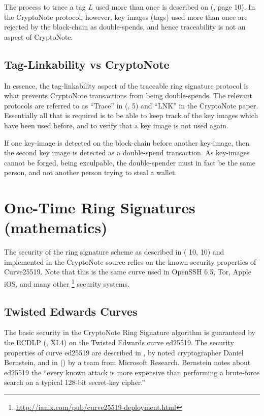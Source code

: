 \documentclass[12pt,english]{mrl}
\numberwithin{equation}{section}
\numberwithin{figure}{section}
\begin{document}
The process to trace a tag $L$ used more than once is described
on (\cite{FS}, page 10). In the CryptoNote protocol, however, key
images (tags) used more than once are rejected by the block-chain
as double-spends, and hence traceability is not an aspect of CryptoNote.


\subsection{Tag-Linkability vs CryptoNote}

In essence, the tag-linkability aspect of the traceable ring signature
protocol is what prevents CryptoNote transactions from being double-spends.
The relevant protocols are referred to as ``Trace'' in (\cite{FS},
5) and ``LNK'' in the CryptoNote paper. Essentially all that is
required is to be able to keep track of the key images which have
been used before, and to verify that a key image is not used again. 

If one key-image is detected on the block-chain before
another key-image, then the second key image is detected as a double-spend
transaction. As key-images cannot be forged, being exculpable, the
double-spender must in fact be the same person, and not another person
trying to steal a wallet. 


\section{One-Time Ring Signatures (mathematics)}

The security of the ring signature scheme as described in (\cite{FS}
10, \cite{CN} 10) and implemented in the CryptoNote source relies on the known
security properties of Curve25519. Note that this is the same curve
used in OpenSSH 6.5, Tor, Apple iOS, and many other%
\footnote{\url{http://ianix.com/pub/curve25519-deployment.html}%
} security systems.


\subsection{\label{sub:Twisted-Edwards-Curves}Twisted Edwards Curves}

The basic security in the CryptoNote Ring Signature algorithm is guaranteed
by the ECDLP (\cite{Si}, XI.4) on the Twisted Edwards curve ed25519.
The security properties of curve ed25519 are described in \cite{Bern},
by noted cryptographer Daniel Bernstein, and in (\cite{BCPM}) by
a team from Microsoft Research. Bernstein notes about ed25519 the ``every known
attack is more expensive than performing a brute-force search on a
typical 128-bit secret-key cipher.'' 
\end{document}

